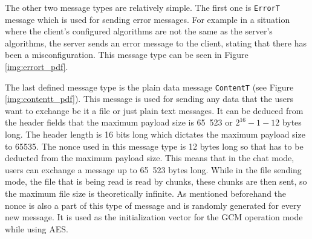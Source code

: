The other two message types are relatively simple. The first one is \texttt{ErrorT} message which is used for sending error messages. For example in a situation where the client's configured algorithms are not the same as the server's algorithms, the server sends an error message to the client, stating that there has been a misconfiguration. This message type can be seen in Figure \ref{img:errort_pdf}.

The last defined message type is the plain data message \texttt{ContentT} (see Figure \ref{img:contentt_pdf}). This message is used for sending any data that the users want to exchange be it a file or just plain text messages. It can be deduced from the header fields that the maximum payload size is 65~523 or $2^{16}-1-12$ bytes long. The header length is 16 bits long which dictates the maximum payload size to 65535. The nonce used in this message type is 12 bytes long so that has to be deducted from the maximum payload size. This means that in the chat mode, users can exchange a message up to 65~523 bytes long. While in the file sending mode, the file that is being read is read by chunks, these chunks are then sent, so the maximum file size is theoretically infinite. As mentioned beforehand the nonce is also a part of this type of message and is randomly generated for every new message. It is used as the initialization vector for the GCM operation mode while using AES.

